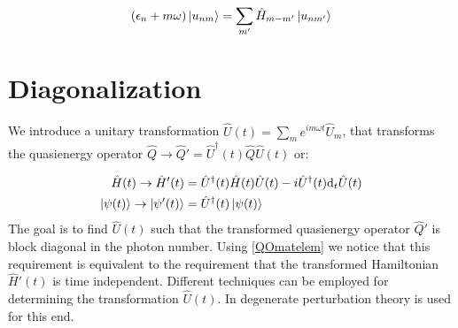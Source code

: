 \begin{equation}
(\epsilon_n+m\omega)\ket{u_{nm}} = \sum_{m'}\hat{H}_{m-m'}\ket{u_{nm'}}
\end{equation}

\section{Diagonalization}

We introduce a unitary transformation $\hat{U}(t)=\sum_m e^{im\omega t}\hat{U}_m$, that transforms the quasienergy operator $\hat{Q} \rightarrow \hat{Q}'=\hat{U}^{\dagger}(t)\hat{Q}\hat{U}(t)$ or:

\begin{align}
\hat{H}(t) \rightarrow \hat{H}'(t) &= \hat{U}^{\dagger}(t)\hat{H}(t)\hat{U}(t) - i\hat{U}^{\dagger}(t)\text{d}_t\hat{U}(t) \\
\ket{\psi(t)} \rightarrow \ket{\psi'(t)} &= \hat{U}^{\dagger}(t)\ket{\psi(t)}
\end{align}
The goal is to find $\hat{U}(t)$ such that the transformed quasienergy operator $\hat{Q}'$ is block diagonal in the photon number. Using \ref{QOmatelem} we notice that this requirement is equivalent to the requirement that the transformed Hamiltonian $\hat{H}'(t)$ is time independent. Different techniques can be employed for determining the transformation $\hat{U}(t)$. In \cite{Eckardt2015} degenerate perturbation theory is used for this end.

















